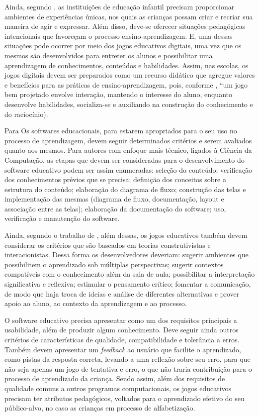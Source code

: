 \documentclass[article,12pt,openany,oneside,a4paper,english,brazil]{abntex2}
\begin{document}
Ainda, segundo , as instituições de educação infantil precisam proporcionar ambientes de experiências únicas, nos quais as crianças possam criar e recriar sua maneira de agir e expressar. Além disso, deve-se oferecer situações pedagógicas intencionais que favoreçam o processo ensino-aprendizagem. E, uma dessas situações pode ocorrer por meio dos jogos educativos digitais, uma vez que os mesmos são desenvolvidos para entreter os alunos e possibilitar uma aprendizagem de conhecimentos, conteúdos e habilidades. Assim, nas escolas, os jogos digitais devem ser preparados como um recurso didático que agregue valores e benefícios para as práticas de ensino-aprendizagem, pois, conforme , “um jogo bem projetado envolve interação, mantendo o interesse do aluno, enquanto desenvolve habilidades, socializa-se e auxiliando na construção do conhecimento e do raciocínio).

Para  Os softwares educacionais, para estarem apropriados para o seu uso no processo de aprendizagem, devem seguir determinados critérios e serem avaliados quanto aos mesmos. Para autores com enfoque mais técnico, ligados à Ciência da Computação, as etapas que devem ser consideradas para o desenvolvimento do software educativo podem ser assim enumeradas: seleção do conteúdo; verificação dos conhecimentos prévios que se precisa; definição dos conceitos sobre a estrutura do conteúdo; elaboração do diagrama de fluxo; construção das telas e implementação das mesmas (diagrama de fluxo, documentação, layout e associação entre as telas); elaboração da documentação do software; uso, verificação e manutenção do software.

Ainda, segundo o trabalho de , além dessas, os jogos educativos também devem considerar os critérios que são baseados em teorias construtivistas e interacionistas. Dessa forma os desenvolvedores deveriam: sugerir ambientes que possibilitem o aprendizado sob múltiplas perspectivas; sugerir contextos compatíveis com o conhecimento além da sala de aula; possibilitar a interpretação significativa e reflexiva; estimular o pensamento crítico; fomentar a comunicação, de modo que haja troca de ideias e análise de diferentes alternativas e prover apoio ao aluno, ao contexto da aprendizagem e ao processo.

O software educativo precisa apresentar como um dos requisitos principais a usabilidade, além de produzir algum conhecimento. Deve seguir ainda outros critérios de características de qualidade, compatibilidade e tolerância a erros. Também devem apresentar um \textit{feedback} ao usuário que facilite o aprendizado, como pistas da resposta correta, levando a uma reflexão sobre seu erro, para que não seja apenas um jogo de tentativa e erro, o que não traria contribuição para o processo de aprendizado da criança. Sendo assim, além dos requisitos de qualidade comuns a outros programas computacionais, os jogos educativos precisam ter atributos pedagógicos, voltados para o aprendizado efetivo do seu público-alvo, no caso as crianças em processo de alfabetização.
\end{document}
